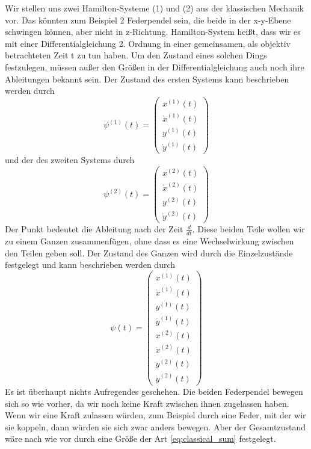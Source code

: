 \documentclass[12pt]{book}
\begin{document}
Wir stellen uns zwei Hamilton-Systeme (1) und (2) aus der klassischen Mechanik vor. Das könnten zum Beispiel 2 Federpendel sein, die beide in der x-y-Ebene schwingen können, aber nicht in z-Richtung. Hamilton-System heißt, dass wir es mit einer Differentialgleichung 2. Ordnung in einer gemeinsamen, als objektiv betrachteten Zeit t zu tun haben. Um den Zustand eines solchen Dings festzulegen, müssen außer den Größen in der Differentialgleichung auch noch ihre Ableitungen bekannt sein. Der Zustand des ersten Systems kann beschrieben werden durch
\begin{equation*}\psi^{(1)}(t) = \begin{pmatrix}
x^{(1)}(t) \\ \dot{x}^{(1)}(t) \\ y^{(1)}(t) \\ \dot{y}^{(1)}(t)
\end{pmatrix}\end{equation*} 
und der des zweiten Systems durch
\begin{equation*}\psi^{(2)}(t) = \begin{pmatrix}
x^{(2)}(t) \\ \dot{x}^{(2)}(t) \\ y^{(2)}(t) \\ \dot{y}^{(2)}(t)
\end{pmatrix}\end{equation*} 
Der Punkt bedeutet die Ableitung nach der Zeit $\frac{d}{dt}$. Diese beiden Teile wollen wir zu einem Ganzen zusammenfügen, ohne dass es eine Wechselwirkung zwischen den Teilen geben soll. Der Zustand des Ganzen wird durch die Einzelzustände festgelegt und kann beschrieben werden durch 
\begin{equation}\psi(t) = \begin{pmatrix}
x^{(1)}(t) \\ \dot{x}^{(1)}(t) \\ y^{(1)}(t) \\ \dot{y}^{(1)}(t) \\
x^{(2)}(t) \\ \dot{x}^{(2)}(t) \\ y^{(2)}(t) \\ \dot{y}^{(2)}(t)
\label{eq:classical_sum}
\end{pmatrix}\end{equation} 
Es ist überhaupt nichts Aufregendes geschehen. Die beiden Federpendel bewegen sich so wie vorher, da wir noch keine Kraft zwischen ihnen zugelassen haben. Wenn wir eine Kraft zulassen würden, zum Beispiel durch eine Feder, mit der wir sie koppeln, dann würden sie sich zwar anders bewegen. Aber der Gesamtzustand wäre nach wie vor durch eine Größe der Art \ref{eq:classical_sum} festgelegt.
\end{document}
